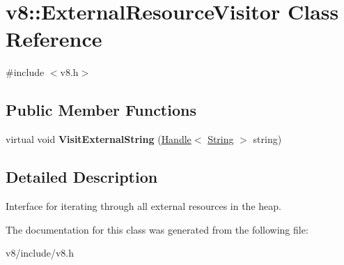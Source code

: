 \hypertarget{classv8_1_1ExternalResourceVisitor}{}\section{v8\+:\+:External\+Resource\+Visitor Class Reference}
\label{classv8_1_1ExternalResourceVisitor}


{\ttfamily \#include $<$v8.\+h$>$}

\subsection*{Public Member Functions}
\begin{DoxyCompactItemize}
\item 
\hypertarget{classv8_1_1ExternalResourceVisitor_ab00ff4cd0d0167894faa8331b68a58c6}{}virtual void {\bfseries Visit\+External\+String} (\hyperlink{classv8_1_1Handle}{Handle}$<$ \hyperlink{classv8_1_1String}{String} $>$ string)\label{classv8_1_1ExternalResourceVisitor_ab00ff4cd0d0167894faa8331b68a58c6}

\end{DoxyCompactItemize}


\subsection{Detailed Description}
Interface for iterating through all external resources in the heap. 

The documentation for this class was generated from the following file\+:\begin{DoxyCompactItemize}
\item 
v8/include/v8.\+h\end{DoxyCompactItemize}
